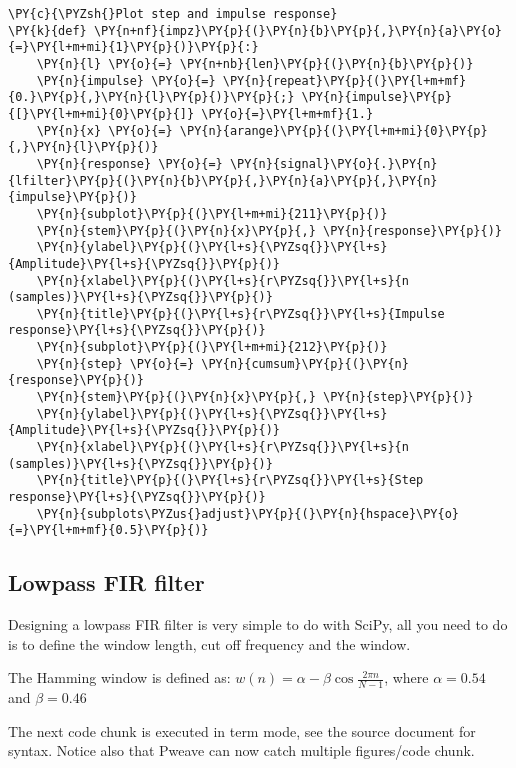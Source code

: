 \documentclass[a4paper,11pt,final]{article}
\begin{document}
\begin{Verbatim}[commandchars=\\\{\},frame=single,fontsize=\small, xleftmargin=0.5em]
\PY{c}{\PYZsh{}Plot step and impulse response}
\PY{k}{def} \PY{n+nf}{impz}\PY{p}{(}\PY{n}{b}\PY{p}{,}\PY{n}{a}\PY{o}{=}\PY{l+m+mi}{1}\PY{p}{)}\PY{p}{:}
    \PY{n}{l} \PY{o}{=} \PY{n+nb}{len}\PY{p}{(}\PY{n}{b}\PY{p}{)}
    \PY{n}{impulse} \PY{o}{=} \PY{n}{repeat}\PY{p}{(}\PY{l+m+mf}{0.}\PY{p}{,}\PY{n}{l}\PY{p}{)}\PY{p}{;} \PY{n}{impulse}\PY{p}{[}\PY{l+m+mi}{0}\PY{p}{]} \PY{o}{=}\PY{l+m+mf}{1.}
    \PY{n}{x} \PY{o}{=} \PY{n}{arange}\PY{p}{(}\PY{l+m+mi}{0}\PY{p}{,}\PY{n}{l}\PY{p}{)}
    \PY{n}{response} \PY{o}{=} \PY{n}{signal}\PY{o}{.}\PY{n}{lfilter}\PY{p}{(}\PY{n}{b}\PY{p}{,}\PY{n}{a}\PY{p}{,}\PY{n}{impulse}\PY{p}{)}
    \PY{n}{subplot}\PY{p}{(}\PY{l+m+mi}{211}\PY{p}{)}
    \PY{n}{stem}\PY{p}{(}\PY{n}{x}\PY{p}{,} \PY{n}{response}\PY{p}{)}
    \PY{n}{ylabel}\PY{p}{(}\PY{l+s}{\PYZsq{}}\PY{l+s}{Amplitude}\PY{l+s}{\PYZsq{}}\PY{p}{)}
    \PY{n}{xlabel}\PY{p}{(}\PY{l+s}{r\PYZsq{}}\PY{l+s}{n (samples)}\PY{l+s}{\PYZsq{}}\PY{p}{)}
    \PY{n}{title}\PY{p}{(}\PY{l+s}{r\PYZsq{}}\PY{l+s}{Impulse response}\PY{l+s}{\PYZsq{}}\PY{p}{)}
    \PY{n}{subplot}\PY{p}{(}\PY{l+m+mi}{212}\PY{p}{)}
    \PY{n}{step} \PY{o}{=} \PY{n}{cumsum}\PY{p}{(}\PY{n}{response}\PY{p}{)}
    \PY{n}{stem}\PY{p}{(}\PY{n}{x}\PY{p}{,} \PY{n}{step}\PY{p}{)}
    \PY{n}{ylabel}\PY{p}{(}\PY{l+s}{\PYZsq{}}\PY{l+s}{Amplitude}\PY{l+s}{\PYZsq{}}\PY{p}{)}
    \PY{n}{xlabel}\PY{p}{(}\PY{l+s}{r\PYZsq{}}\PY{l+s}{n (samples)}\PY{l+s}{\PYZsq{}}\PY{p}{)}
    \PY{n}{title}\PY{p}{(}\PY{l+s}{r\PYZsq{}}\PY{l+s}{Step response}\PY{l+s}{\PYZsq{}}\PY{p}{)}
    \PY{n}{subplots\PYZus{}adjust}\PY{p}{(}\PY{n}{hspace}\PY{o}{=}\PY{l+m+mf}{0.5}\PY{p}{)}
\end{Verbatim}


\subsection{Lowpass FIR filter}

Designing a lowpass FIR filter is very simple to do with SciPy, all you
need to do is to define the window length, cut off frequency and the
window.

The Hamming window is defined as:
$w(n) = \alpha - \beta\cos\frac{2\pi n}{N-1}$, where $\alpha=0.54$ and
$\beta=0.46$

The next code chunk is executed in term mode, see the source document
for syntax. Notice also that Pweave can now catch multiple
figures/code chunk.
\end{document}
